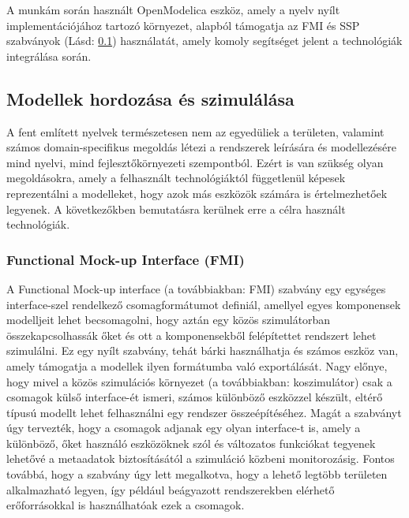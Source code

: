         A munkám során használt OpenModelica eszköz, amely a nyelv nyílt implementációjához tartozó
        környezet, alapból támogatja az FMI és SSP szabványok (Lásd: \ref{sec:ModellHord}) használatát, amely komoly segítséget jelent a technológiák
        integrálása során.

    \subsection{Modellek hordozása és szimulálása} \label{sec:ModellHord}
    A fent említett nyelvek természetesen nem az egyedüliek a területen, valamint számos domain-specifikus megoldás létezi a rendszerek leírására és modellezésére mind nyelvi, mind fejlesztőkörnyezeti szempontból.
    Ezért is van szükség olyan megoldásokra, amely a felhasznált technológiáktól függetlenül képesek reprezentálni a modelleket, hogy azok más eszközök számára is értelmezhetőek legyenek. A következőkben bemutatásra kerülnek erre a célra használt technológiák.
    
        \subsubsection{Functional Mock-up Interface (FMI)} \label{sec:fmi}
        A Functional Mock-up interface (a továbbiakban: FMI) szabvány egy egységes interface-szel
        rendelkező csomagformátumot definiál, amellyel egyes komponensek modelljeit lehet becsomagolni,
        hogy aztán egy közös szimulátorban összekapcsolhassák őket és ott a komponensekből felépítettet
        rendszert lehet szimulálni. Ez egy nyílt szabvány, tehát bárki használhatja és számos eszköz van,
        amely támogatja a modellek ilyen formátumba való exportálását. Nagy előnye, hogy mivel a közös
        szimulációs környezet (a továbbiakban: koszimulátor) csak a csomagok külső interface-ét ismeri,
        számos különböző eszközzel készült, eltérő típusú modellt lehet felhasználni egy rendszer
        összeépítéséhez. Magát a szabványt úgy tervezték, hogy a csomagok adjanak egy olyan interface-t is,
        amely a különböző, őket használó eszközöknek szól és változatos funkciókat tegyenek lehetővé a
        metaadatok biztosításától a szimuláció közbeni monitorozásig. Fontos továbbá, hogy a szabvány úgy
        lett megalkotva, hogy a lehető legtöbb területen alkalmazható legyen, így például beágyazott
        rendszerekben elérhető erőforrásokkal is használhatóak ezek a csomagok.

